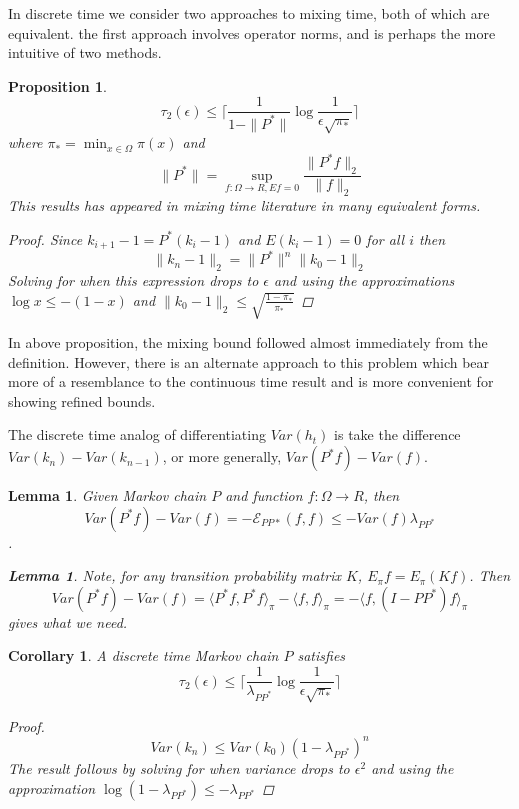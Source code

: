 \documentclass[12pt,reqno]{amsart}
\newtheorem{cor}[thm]{Corollary}
\newtheorem{lem}[thm]{Lemma}
\newtheorem{prop}[thm]{Proposition}
\begin{document}
In discrete time we consider two approaches to mixing time, both of which are equivalent. the first approach involves operator norms, and is perhaps the more intuitive of two methods.

\begin{prop}
  \begin{equation}
    \label{eq:discrete_bound}
    \tau_2(\epsilon) \leq \lceil \frac{1}{1-\|P^*\|} \log \frac{1}{\epsilon \sqrt{\pi_*}} \rceil
  \end{equation}
  where $\pi_* = \min_{x\in \Omega}\pi(x)$ and
  $$\|P^*\|= \sup_{f:\Omega \rightarrow R, E f=0}\frac{\|P^*f\|_2}{\|f\|_2}$$
This results has appeared in mixing time literature in many equivalent forms.

  \begin{proof}
  Since $k_{i+1}-1=P^*(k_i-1)$ and $E(k_i - 1)=0$ for all $i$ then
  $$\|k_n-1 \|_2 = \|P^*\|^n\|k_0-1\|_2$$
  Solving for when this expression drops to $\epsilon$ and using the approximations
  $\log x\leq -(1-x)$ and $\|k_0-1\|_2\leq \sqrt{\frac{1-\pi_*}{\pi_*}} $ 
  \end{proof}
\end{prop}


In above proposition, the mixing bound followed almost immediately from the definition. However, there is an alternate approach to this problem which bear more of a resemblance to the continuous time result and is more convenient for showing refined bounds.

The discrete time analog of differentiating $Var(h_t)$ is take the difference 
$Var(k_n)-Var(k_{n-1})$, or more generally, $Var(P^*f)-Var(f)$.

\begin{lem}
  Given Markov chain $P$ and function $f:\Omega \rightarrow R$, then
  $$Var(P^*f)-Var(f) = -\mathcal{E}_{PP*}(f,f) \leq -Var(f)\lambda_{PP^*}$$.
  \begin{lem}
    Note, for any transition probability matrix $K$, $E_{\pi}f = E_{\pi}(Kf)$. Then
$$Var(P^*f)-Var(f)=\langle P^*f,P^*f \rangle_{\pi} - \langle f,f \rangle_{\pi} 
= -\langle f,(I-PP^*)f \rangle_{\pi}
$$
gives what we need.
  \end{lem}
\end{lem}


\begin{cor}
  A discrete time Markov chain $P$ satisfies 
  \begin{equation}
    \label{eq:discrere_bound_2}
    \tau_2(\epsilon) \leq \lceil \frac{1}{\lambda_{PP^*}} \log \frac{1}{\epsilon \sqrt{\pi_*}} \rceil
  \end{equation}

  \begin{proof}
    \begin{equation}
      Var(k_n)\leq Var(k_0)(1-\lambda_{PP^*})^n
    \end{equation}
The result follows by solving for when variance drops to $\epsilon^2$ and using
the approximation $\log(1-\lambda_{PP^*}) \leq -\lambda_{PP^*}$
  \end{proof}
\end{cor}
\end{document}
